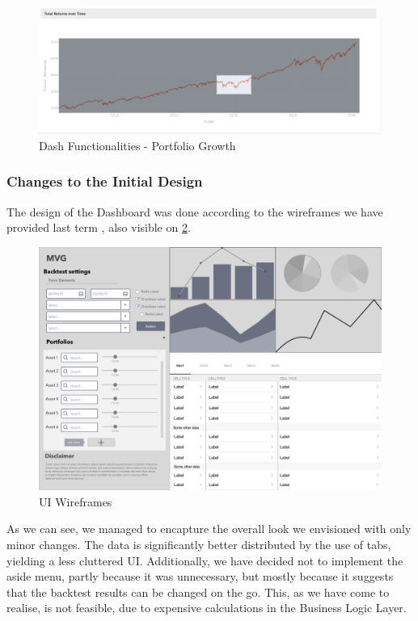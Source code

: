 \documentclass[main.tex]{subfiles}
\begin{document}
\begin{figure}[H]
   \centering
   \includegraphics[width=\textwidth]{04Design/04Pictures/portfolio_growth.png}
   \caption{Dash Functionalities - Portfolio Growth}
   \label{portfolio_growth}
\end{figure}

\subsubsection{Changes to the Initial Design}

The design of the Dashboard was done according to the wireframes we have provided last term \cite{TR}, also visible on \figurename{\ref{wireframe}}.

\begin{figure}[H]
   \centering
   \includegraphics[width=\textwidth]{04Design/04Pictures/wireframe.png}
   \caption{UI Wireframes}
   \label{wireframe}
\end{figure}

As we can see, we managed to encapture the overall look we envisioned with only minor changes. The data is significantly better distributed by the use of tabs, yielding a less cluttered UI. Additionally, we have decided not to implement the aside menu, partly because it was unnecessary, but mostly because it suggests that the backtest results can be changed on the go. This, as we have come to realise, is not feasible, due to expensive calculations in the Business Logic Layer.
\end{document}
